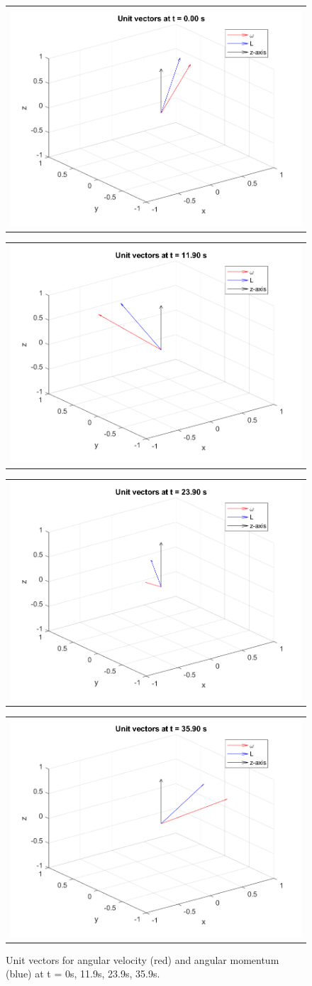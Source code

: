 \begin{figure}[H]
  \centering
  \begin{tabular}{@{}c@{}}
  \includegraphics[width=.47\linewidth]{Images/ps3_problem3Vectors_1.000000.png}
  \end{tabular}
  \begin{tabular}{@{}c@{}}
  \includegraphics[width=.47\linewidth]{Images/ps3_problem3Vectors_120.000000.png}
  \end{tabular}
  \begin{tabular}{@{}c@{}}
  \includegraphics[width=.47\linewidth]{Images/ps3_problem3Vectors_240.000000.png}
  \end{tabular}
  \begin{tabular}{@{}c@{}}
  \includegraphics[width=.47\linewidth]{Images/ps3_problem3Vectors_360.000000.png}
  \end{tabular}
  \caption{Unit vectors for angular velocity (red) and angular momentum (blue) at t = 0s, 11.9s, 23.9s, 35.9s.}
  \label{fig:Body Axis Momentum Snapshots}
\end{figure}


